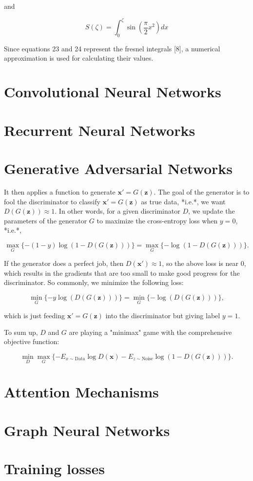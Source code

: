and

$$
S(\zeta)=\int_{0}^{\zeta} \sin \left(\frac{\pi}{2} x^{2}\right) d x
$$

Since equations 23 and 24 represent the fresnel integrals [8], a numerical approximation is used for calculating their values.

\section{Convolutional Neural Networks}
\label{sec:3_cnns}

\section{Recurrent Neural Networks}
\label{sec:3_rnns}

\section{Generative Adversarial Networks}
\label{sec:3_gans}

It then applies a function to generate $\mathbf x'=G(\mathbf z)$. The goal of the generator is to fool the discriminator to classify $\mathbf x'=G(\mathbf z)$ as true data, *i.e.*, we want $D( G(\mathbf z)) \approx 1$.
In other words, for a given discriminator $D$, we update the parameters of the generator $G$ to maximize the cross-entropy loss when $y=0$, *i.e.*,

$$ \max_G \{ - (1-y) \log(1-D(G(\mathbf z))) \} = \max_G \{ - \log(1-D(G(\mathbf z))) \}.$$

If the generator does a perfect job, then $D(\mathbf x')\approx 1$, so the above loss is near 0, which results in the gradients that are too small to make good progress for the discriminator. So commonly, we minimize the following loss:

$$ \min_G \{ - y \log(D(G(\mathbf z))) \} = \min_G \{ - \log(D(G(\mathbf z))) \}, $$

which is just feeding $\mathbf x'=G(\mathbf z)$ into the discriminator but giving label $y=1$.


To sum up, $D$ and $G$ are playing a "minimax" game with the comprehensive objective function:

$$\min_D \max_G \{ -E_{x \sim \text{Data}} \log D(\mathbf x) - E_{z \sim \text{Noise}} \log(1 - D(G(\mathbf z))) \}.$$

\section{Attention Mechanisms}
\label{sec:3_attention}

\section{Graph Neural Networks}
\label{sec:3_gnns}

\section{Training losses}
\label{sec:3_losses}